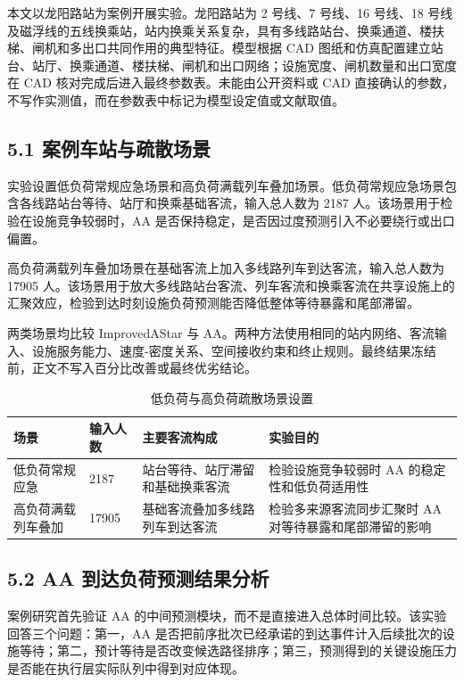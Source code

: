 \documentclass[UTF8,a4paper,12pt]{ctexart}
\begin{document}
本文以龙阳路站为案例开展实验。龙阳路站为 2 号线、7 号线、16 号线、18 号线及磁浮线的五线换乘站，站内换乘关系复杂，具有多线路站台、换乘通道、楼扶梯、闸机和多出口共同作用的典型特征。模型根据 CAD 图纸和仿真配置建立站台、站厅、换乘通道、楼扶梯、闸机和出口网络；设施宽度、闸机数量和出口宽度在 CAD 核对完成后进入最终参数表。未能由公开资料或 CAD 直接确认的参数，不写作实测值，而在参数表中标记为模型设定值或文献取值。

\subsection{5.1 案例车站与疏散场景}

实验设置低负荷常规应急场景和高负荷满载列车叠加场景。低负荷常规应急场景包含各线路站台等待、站厅和换乘基础客流，输入总人数为 2187 人。该场景用于检验在设施竞争较弱时，AA 是否保持稳定，是否因过度预测引入不必要绕行或出口偏置。

高负荷满载列车叠加场景在基础客流上加入多线路列车到达客流，输入总人数为 17905 人。该场景用于放大多线路站台客流、列车客流和换乘客流在共享设施上的汇聚效应，检验到达时刻设施负荷预测能否降低整体等待暴露和尾部滞留。

两类场景均比较 ImprovedAStar 与 AA。两种方法使用相同的站内网络、客流输入、设施服务能力、速度-密度关系、空间接收约束和终止规则。最终结果冻结前，正文不写入百分比改善或最终优劣结论。

\begin{table}[htbp]
\centering
\caption{低负荷与高负荷疏散场景设置}
\small
\begin{tabular}{p{}p{}p{}p{}}
\toprule
场景 & 输入人数 & 主要客流构成 & 实验目的 \\
\midrule
低负荷常规应急 & 2187 & 站台等待、站厅滞留和基础换乘客流 & 检验设施竞争较弱时 AA 的稳定性和低负荷适用性 \\
高负荷满载列车叠加 & 17905 & 基础客流叠加多线路列车到达客流 & 检验多来源客流同步汇聚时 AA 对等待暴露和尾部滞留的影响 \\
\bottomrule
\end{tabular}
\end{table}

\subsection{5.2 AA 到达负荷预测结果分析}

案例研究首先验证 AA 的中间预测模块，而不是直接进入总体时间比较。该实验回答三个问题：第一，AA 是否把前序批次已经承诺的到达事件计入后续批次的设施等待；第二，预计等待是否改变候选路径排序；第三，预测得到的关键设施压力是否能在执行层实际队列中得到对应体现。
\end{document}
